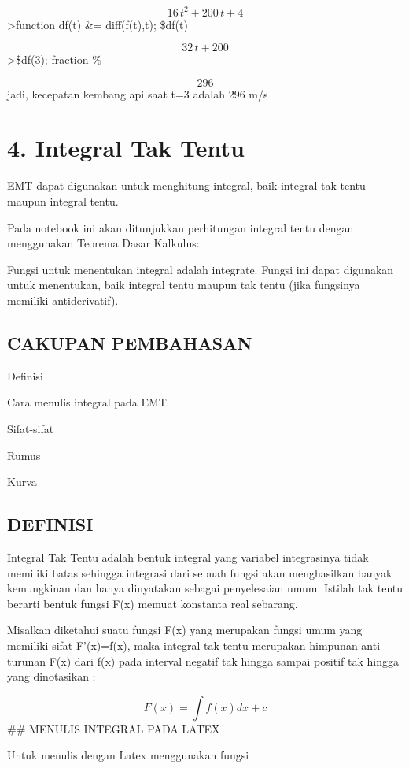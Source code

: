 \documentclass[
]{book}
\begin{document}
\[16\,t^2+200\,t+4\]\textgreater function df(t) \&= diff(f(t),t); \$df(t)

\[32\,t+200\]\textgreater\$df(3); fraction \%

\[296\]jadi, kecepatan kembang api saat t=3 adalah 296 m/s

\chapter{4. Integral Tak Tentu}\label{integral-tak-tentu}

EMT dapat digunakan untuk menghitung integral, baik integral tak tentu maupun integral tentu.

Pada notebook ini akan ditunjukkan perhitungan integral tentu dengan menggunakan Teorema Dasar Kalkulus:

Fungsi untuk menentukan integral adalah integrate. Fungsi ini dapat digunakan untuk menentukan, baik integral tentu maupun tak tentu (jika fungsinya memiliki antiderivatif).

\section{CAKUPAN PEMBAHASAN}\label{cakupan-pembahasan}

Definisi

Cara menulis integral pada EMT

Sifat-sifat

Rumus

Kurva

\section{DEFINISI}\label{definisi}

Integral Tak Tentu adalah bentuk integral yang variabel integrasinya tidak memiliki batas sehingga integrasi dari sebuah fungsi akan menghasilkan banyak kemungkinan dan hanya dinyatakan sebagai penyelesaian umum. Istilah tak tentu berarti bentuk fungsi F(x) memuat konstanta real sebarang.

Misalkan diketahui suatu fungsi F(x) yang merupakan fungsi umum yang memiliki sifat F'(x)=f(x), maka integral tak tentu merupakan himpunan anti turunan F(x) dari f(x) pada interval negatif tak hingga sampai positif tak hingga yang dinotasikan :

\[F(x) = \int f(x) dx+c\]\#\# MENULIS INTEGRAL PADA LATEX

Untuk menulis dengan Latex menggunakan fungsi \int
\end{document}
